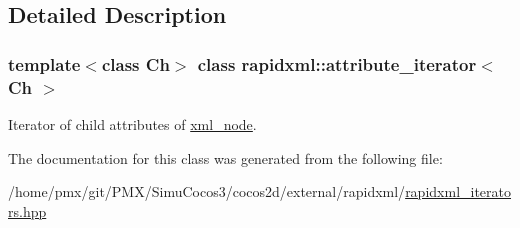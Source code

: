 \subsection{Detailed Description}
\subsubsection*{template$<$class Ch$>$\newline
class rapidxml\+::attribute\+\_\+iterator$<$ Ch $>$}

Iterator of child attributes of \hyperlink{classrapidxml_1_1xml__node}{xml\+\_\+node}. 

The documentation for this class was generated from the following file\+:\begin{DoxyCompactItemize}
\item 
/home/pmx/git/\+P\+M\+X/\+Simu\+Cocos3/cocos2d/external/rapidxml/\hyperlink{rapidxml__iterators_8hpp}{rapidxml\+\_\+iterators.\+hpp}\end{DoxyCompactItemize}
